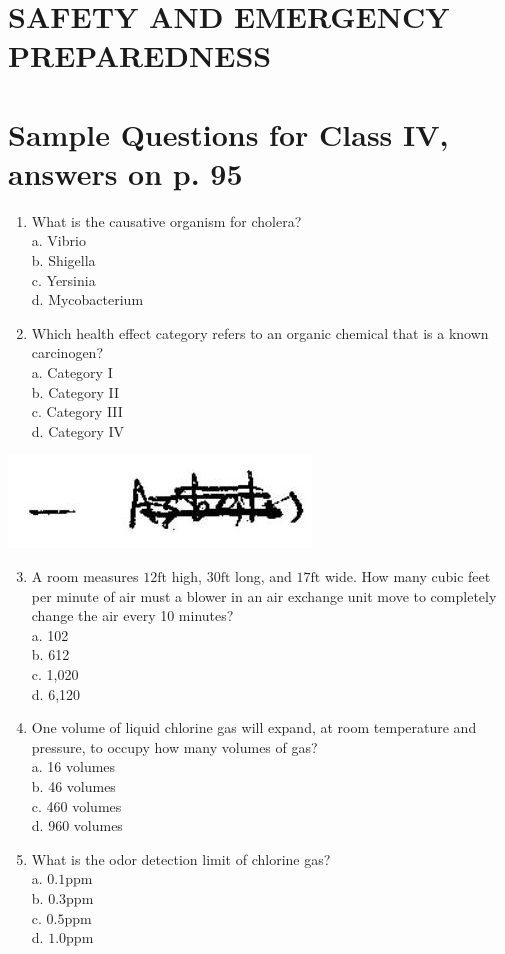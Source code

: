 \documentclass[10pt]{article}
\begin{document}
\section{SAFETY AND EMERGENCY PREPAREDNESS}
\section{Sample Questions for Class IV, answers on p. 95}
\begin{enumerate}
  \item What is the causative organism for cholera?\\
a. Vibrio\\
b. Shigella\\
c. Yersinia\\
d. Mycobacterium

  \item Which health effect category refers to an organic chemical that is a known carcinogen?\\
a. Category I\\
b. Category II\\
c. Category III\\
d. Category IV

\end{enumerate}

\includegraphics[max width=\textwidth]{2022_11_11_ca6a6c1a0324ee23e523g-40}

\begin{enumerate}
  \setcounter{enumi}{2}
  \item A room measures $12 \mathrm{ft}$ high, $30 \mathrm{ft}$ long, and $17 \mathrm{ft}$ wide. How many cubic feet per minute of air must a blower in an air exchange unit move to completely change the air every 10 minutes?\\
a. 102\\
b. 612\\
c. 1,020\\
d. 6,120

  \item One volume of liquid chlorine gas will expand, at room temperature and pressure, to occupy how many volumes of gas?\\
a. 16 volumes\\
b. 46 volumes\\
c. 460 volumes\\
d. 960 volumes

  \item What is the odor detection limit of chlorine gas?\\
a. $0.1 \mathrm{ppm}$\\
b. $0.3 \mathrm{ppm}$\\
c. $0.5 \mathrm{ppm}$\\
d. $1.0 \mathrm{ppm}$

\end{enumerate}
\end{document}

